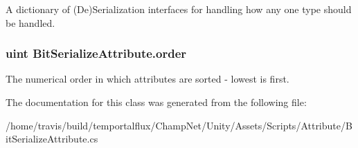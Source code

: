A dictionary of (De)Serialization interfaces for handling how any one type should be handled. 

\hypertarget{class_bit_serialize_attribute_ad0a026f7b3c5c95879852db7a66a2726}{
\subsubsection[{order}]{\setlength{\rightskip}{0pt plus 5cm}uint Bit\-Serialize\-Attribute.\-order}}\label{class_bit_serialize_attribute_ad0a026f7b3c5c95879852db7a66a2726}


The numerical order in which attributes are sorted -\/ lowest is first. 



The documentation for this class was generated from the following file\-:\begin{DoxyCompactItemize}
\item 
/home/travis/build/temportalflux/\-Champ\-Net/\-Unity/\-Assets/\-Scripts/\-Attribute/Bit\-Serialize\-Attribute.\-cs\end{DoxyCompactItemize}
